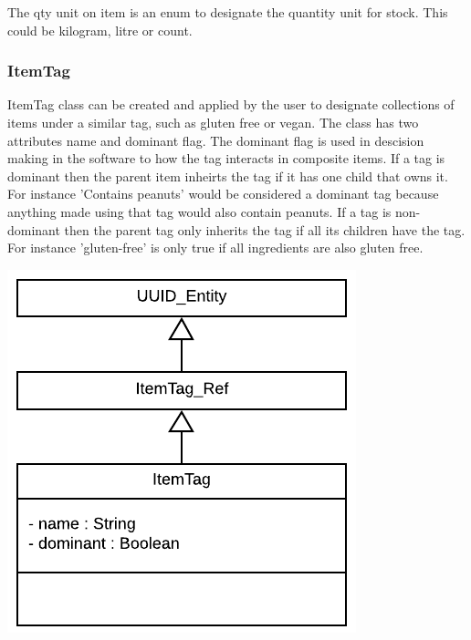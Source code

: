	The qty unit on item is an enum to designate the quantity unit for stock. This could be kilogram, litre or count.
	

\subsubsection{ItemTag}

	\begin{minipage}[t]{.6\linewidth}
		ItemTag class can be created and applied by the user to designate collections of items under a similar tag, such as gluten free or vegan. The class has two attributes name and dominant flag. The dominant flag is used in descision making in the software to how the tag interacts in composite items. If a tag is dominant then the parent item inheirts the tag if it has one child that owns it. For instance 'Contains peanuts' would be considered a dominant tag because anything made using that tag would also contain peanuts. If a tag is non-dominant then the parent tag only inherits the tag if all its children have the tag. For instance 'gluten-free' is only true if all ingredients are also gluten free. 
		
	\end{minipage}
	\hspace{0.02\linewidth}
	\begin{minipage}[t][][b]{.3\linewidth}
		\includegraphics[width=\linewidth]{images/data_model/tag.png}
	\end{minipage}


